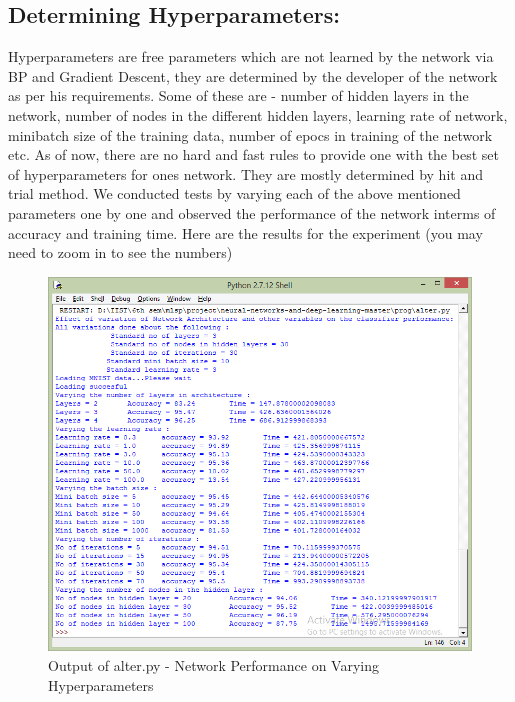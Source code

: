 \documentclass[conference]{IEEEtran}
\begin{document}
\subsection{Determining Hyperparameters:}
Hyperparameters are free parameters which are not learned by the network via BP and Gradient Descent, they are determined by the developer of the network as per his requirements. Some of these are - number of hidden layers in the network, number of nodes in the different hidden layers, learning rate of network, minibatch size of the training data, number of epocs in training of the network etc. As of now, there are no hard and fast rules to provide one with the best set of hyperparameters for ones network. They are mostly determined by hit and trial method. We conducted tests by varying each of the above mentioned parameters one by one and observed the performance of the network interms of accuracy and training time. Here are the results for the experiment (you may need to zoom in to see the numbers)
\begin{figure}[h]
	\centering
	\includegraphics[width=\linewidth]{vary}
	\caption{Output of alter.py - Network Performance on Varying Hyperparameters}
\end{figure}
\end{document}
